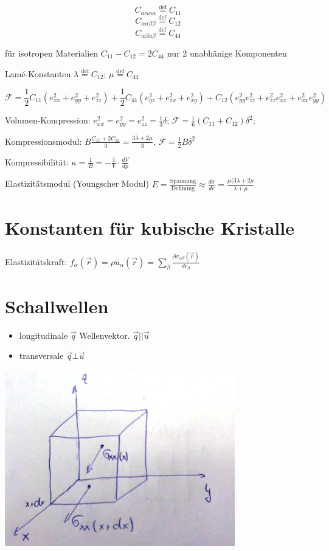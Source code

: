 \[ C_{\alpha\alpha\alpha\alpha} \stackrel{\mathrm{def}}= C_{11} \]
\[ C_{\alpha\alpha\beta\beta} \stackrel{\mathrm{def}}= C_{12} \]
\[ C_{\alpha\beta\alpha\beta} \stackrel{\mathrm{def}}= C_{44} \]

für isotropen Materialien \(C_{11}-C_{12}=2C_{44}\) nur 2 unabhänige
Komponenten

Lamé-Konstanten \(\lambda \stackrel{\mathrm{def}}= C_{12}\);  \(\mu
\stackrel{\mathrm{def}}= C_{44}\)

\[ \mathcal F = \frac 1 2 C_{11} (e^2_{xx}+e^2_{yy}+e^2_{zz})+
\frac 1 2 C_{44} (e^2_{yz}+e^2_{zx}+e^2_{xy})+
C_{12} (e^2_{yy}e^2_{zz}+e^2_{zz}e^2_{xx}+e^2_{xx}e^2_{yy})
\]

Volumen-Kompression: \(e^2_{xx}=e^2_{yy}=e^2_{zz}=\frac 1 3 \delta\);
\(\mathcal F = \frac 1 6(C_{11}+C_{12})\delta^2\);

Kompressionsmodul: \(B\frac{C_{11}+2C_{12}}{3} =
\frac{3\lambda+2\mu}{3}\), \(\mathcal F = \frac 1 2 B\delta^2\)

Kompressibilität: \(\kappa = \frac 1 B = - \frac 1 V \cdot
\frac{dV}{dp}\)

Elastizitätsmodul (Youngscher Modul) \(E =
\frac{\text{Spannung}}{\text{Dehnung}} \approx \frac{d \sigma}{de} =
\frac{\mu(3\lambda + 2\mu}{\lambda +\mu}\)

\section{Konstanten für kubische Kristalle}

Elastizitätskraft: \(f_\alpha(\vec r) = \rho \ddot u_\alpha
(\vec r) = \sum_\beta \frac {\partial \sigma_{\alpha\beta}(\vec r)}{dr_\beta}\)

\section{Schallwellen}

\begin{itemize}
\item longitudinale 
\(\vec q\) Wellenvektor. \(\vec q || \vec u\)
\item transversale \(\vec q \bot  \vec u\)
\end{itemize}


\includegraphics[width=0.75\textwidth]{kap05_01.png}

